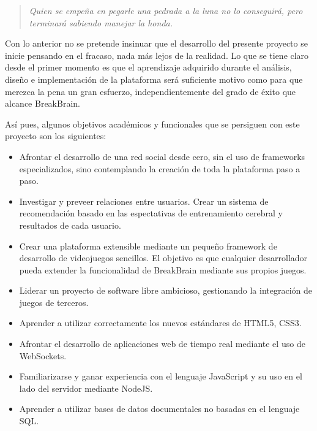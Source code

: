 \begin{quote}
{\it Quien se empeña en pegarle una pedrada a la luna no lo conseguirá, pero terminará sabiendo manejar la honda.}
\end{quote}

Con lo anterior no se pretende insinuar que el desarrollo del presente proyecto se inicie pensando en el fracaso, nada más lejos de la realidad. Lo que se tiene claro desde el primer momento es que el aprendizaje adquirido durante el análisis, diseño e implementación de la plataforma será suficiente motivo como para que merezca la pena un gran esfuerzo, independientemente del grado de éxito que alcance BreakBrain.

Así pues, algunos objetivos académicos y funcionales que se persiguen con este proyecto son los siguientes:

\begin{itemize}
\item Afrontar el desarrollo de una red social desde cero, sin el uso de frameworks especializados, sino contemplando la creación de toda la plataforma paso a paso.
\item Investigar y preveer relaciones entre usuarios. Crear un sistema de recomendación basado en las espectativas de entrenamiento cerebral y resultados de cada usuario.
\item Crear una plataforma extensible mediante un pequeño framework de desarrollo de videojuegos sencillos. El objetivo es que cualquier desarrollador pueda extender la funcionalidad de BreakBrain mediante sus propios juegos.
\item Liderar un proyecto de software libre ambicioso, gestionando la integración de juegos de terceros.
\item Aprender a utilizar correctamente los nuevos estándares de HTML5, CSS3.
\item Afrontar el desarrollo de aplicaciones web de tiempo real mediante el uso de WebSockets.
\item Familiarizarse y ganar experiencia con el lenguaje JavaScript y su uso en el lado del servidor mediante NodeJS.
\item Aprender a utilizar bases de datos documentales no basadas en el lenguaje SQL.
\end{itemize}



